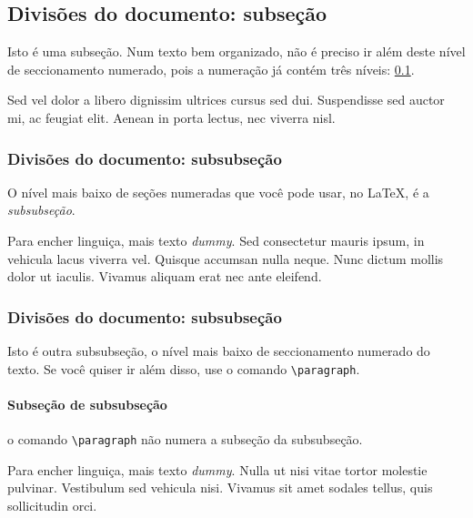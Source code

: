 \subsection{Divisões do documento: subseção}\label{subsectA}

Isto é uma subseção. Num texto bem organizado, não é preciso ir além
deste nível de seccionamento numerado, pois a numeração já contém 
três níveis: \ref{subsectA}.

Sed vel dolor a libero dignissim ultrices cursus sed dui. 
Suspendisse sed auctor mi, ac feugiat elit. Aenean in porta lectus, 
nec viverra nisl.


\subsubsection{Divisões do documento: subsubseção}

O nível mais baixo de seções numeradas que você pode usar, no 
\LaTeX, é a \emph{subsubseção}.

  Para encher linguiça, mais texto \emph{dummy}.
  Sed consectetur mauris ipsum, in vehicula lacus viverra vel. 
  Quisque accumsan nulla neque. Nunc dictum mollis dolor ut 
  iaculis. Vivamus aliquam erat nec ante eleifend. 

\subsubsection{Divisões do documento: subsubseção}

Isto é outra subsubseção, o nível mais baixo de seccionamento numerado do texto.
Se você quiser ir além disso, use o comando \verb|\paragraph|.

\paragraph{Subseção de subsubseção}

o comando \verb|\paragraph| não numera a subseção da subsubseção. 

 Para encher linguiça, mais texto \emph{dummy}. Nulla ut nisi 
 vitae tortor molestie pulvinar. Vestibulum sed vehicula nisi. 
 Vivamus sit amet sodales tellus, quis sollicitudin orci.

